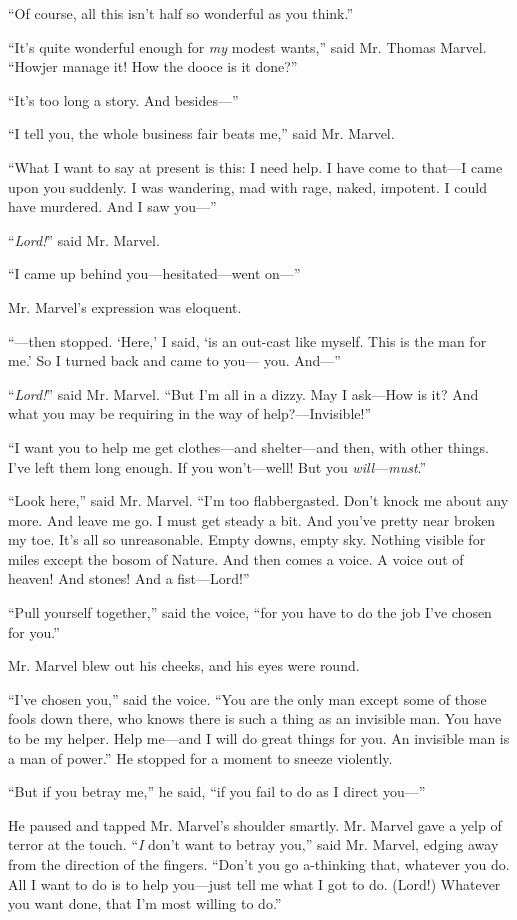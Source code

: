 “Of course, all this isn’t half so wonderful as you think.”

“It’s quite wonderful enough for \emph{my} modest wants,” said Mr. Thomas Marvel. “Howjer manage it! How the dooce is it done?”

“It’s too long a story. And besides—”

{“I tell you, the whole business fair beats me,” said Mr. Marvel.}

“What I want to say at present is this: I need help. I have come to that—I came upon you suddenly. I was wandering, mad with rage, naked, impotent. I could have murdered. And I saw you—”

“\emph{Lord!}” said Mr. Marvel.

“I came up behind you—hesitated—went on—”

Mr. Marvel’s expression was eloquent.

“—then stopped. ‘Here,’ I said, ‘is an out-cast like myself. This is the man for me.’ So I turned back and came to you— you. And—”

“\emph{Lord!}” said Mr. Marvel. “But I’m all in a dizzy. May I ask—How is it? And what you may be requiring in the way of help?—Invisible!”

“I want you to help me get clothes—and shelter—and then, with other things. I’ve left them long enough. If you won’t—well! But you \emph{will}—\emph{must}.”

“Look here,” said Mr. Marvel. “I’m too flabbergasted. Don’t knock me about any more. And leave me go. I must get steady a bit. And you’ve pretty near broken my toe. It’s all so unreasonable. Empty downs, empty sky. Nothing visible for miles except the bosom of Nature. And then comes a voice. A voice out of heaven! And stones! And a fist—Lord!”

“Pull yourself together,” said the voice, “for you have to do the job I’ve chosen for you.”

Mr. Marvel blew out his cheeks, and his eyes were round.

“I’ve chosen you,” said the voice. “You are the only man except some of those fools down there, who knows there is such a thing as an invisible man. You have to be my helper. Help me—and I will do great things for you. An invisible man is a man of power.” He stopped for a moment to sneeze violently.

“But if you betray me,” he said, “if you fail to do as I direct you—”

He paused and tapped Mr. Marvel’s shoulder smartly. Mr. Marvel gave a yelp of terror at the touch. “\emph{I} don’t want to betray you,” said Mr. Marvel, edging away from the direction of the fingers. “Don’t you go a-thinking that, whatever you do. All I want to do is to help you—just tell me what I got to do. (Lord!) Whatever you want done, that I’m most willing to do.”